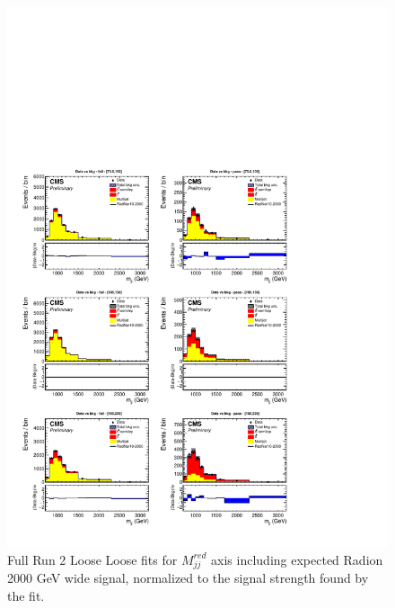 \begin{figure}[!htb]
	\centering
	\includegraphics[width=1\textwidth]{Figures/postfit_projy_fits_LLwide.pdf}
	\caption{Full Run 2 Loose Loose fits for $M_{jj}^{red}$ axis including expected Radion 2000 GeV wide signal, normalized to the signal strength found by the fit.}
	\label{fig:LLmjjwide}
\end{figure}
